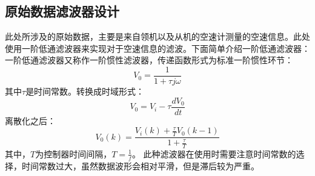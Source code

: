 \subsection{原始数据滤波器设计}
此处所涉及的原始数据，主要是来自领机以及从机的空速计测量的空速信息。此处使用一阶低通滤波器来实现对于空速信息的滤波。下面简单介绍一阶低通滤波器：
一阶低通滤波器又称作一阶惯性滤波器，传递函数形式为标准一阶惯性环节：
\begin{equation}
    V_0=\frac{1}{1+\tau j\omega}
\end{equation}
其中$\tau$是时间常数。转换成时域形式：
\begin{equation}
    V_0=V_i -\tau\frac{dV_0}{dt}
\end{equation}
离散化之后：
\begin{equation}
    V_0(k)=\frac{V_i(k)+\frac{\tau}{T}V_0(k-1)}{1+\frac{\tau}{T}}
\end{equation}
其中，$T$为控制器时间间隔，$T=\frac{1}{f}$。
此种滤波器在使用时需要注意时间常数的选择，时间常数过大，虽然数据波形会相对平滑，但是滞后较为严重。
